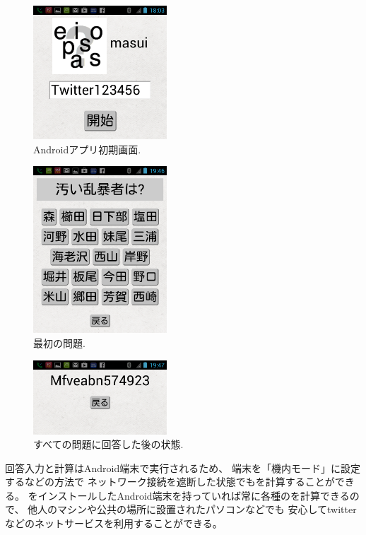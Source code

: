 \documentclass[twoside]{wiss}
\begin{document}
\begin{figure}[H]
\centerline{\includegraphics[width=50mm,bb=0 0 720 720]{figures/android1crop.png}}
\caption{Androidアプリ初期画面.}
\label{android1}
\end{figure}

\begin{figure}[H]
\centerline{\includegraphics[width=50mm,bb=0 0 720 900]{figures/android2crop.png}}
\caption{最初の問題.}
\label{android2}
\end{figure}

\begin{figure}[H]
\centerline{\includegraphics[width=50mm,bb=0 0 720 400]{figures/android3crop.png}}
\caption{すべての問題に回答した後の状態.}
\label{android3}
\end{figure}

回答入力と{\PW}計算はAndroid端末で実行されるため、
端末を「機内モード」に設定するなどの方法で
ネットワーク接続を遮断した状態でも{\PW}を計算することができる。
{\EP}をインストールしたAndroid端末を持っていれば常に各種の{\PW}を計算できるので、
他人のマシンや公共の場所に設置されたパソコンなどでも
安心してtwitterなどのネットサービスを利用することができる。
\end{document}
